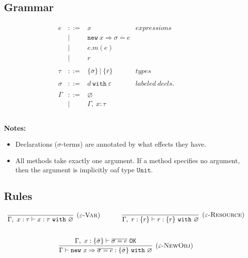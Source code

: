 \documentclass{llncs}
\newcommand{\keywadj}[1]{\mathtt{#1}}
\newcommand{\keyw}[1]{\keywadj{#1}~}
\begin{document}
\subsection{Grammar}

\[
\begin{array}{lll}
\begin{array}{lllr}

	e & ::= & x & expressions \\
  		& | & \keywadj{new}~x \Rightarrow \overline{\sigma = e} \\
  		& | & e.m(e)\\
  		& | & r \\
		&&\\

	\tau & ::= & \{ \bar \sigma \} ~ | ~ \{ \bar r \} & types \\
		&&\\

	\sigma & ::= & d~\keyw{with}\varepsilon  & labeled~ decls.\\
		&&\\
		
	\Gamma & ::= & \varnothing \\
		& | & \Gamma,~x : \tau\\
		&&\\

\end{array}
& ~~~~~~
&
\end{array}
\]


\noindent \textbf{Notes:}

\begin{itemize}
	\item Declarations ($\sigma$-terms) are annotated by what effects they have.
	\item All methods take exactly one argument. If a method specifies no argument, then the argument is implicitly oaf type $\keywadj{Unit}$.
\end{itemize}

\subsection{Rules}

\fbox{$\Gamma \vdash e : \tau~\keyw{with} \varnothing$}

\[
\begin{array}{c}
\infer[\textsc{($\varepsilon$-Var)}]
  {\Gamma,~x:\tau \vdash x:\tau~ \keyw{with} \varnothing}
  {} 
~~~~~~~~~~
\infer[\textsc{($\varepsilon$-Resource)}]
  {\Gamma,~r :\{r\} \vdash r:\{ r \} ~ \keyw{with} \varnothing}
  {} \\[5ex]

\infer[\textsc{($\varepsilon$-NewObj)}]
	{\Gamma \vdash \keywadj{new}~x \Rightarrow \overline{\sigma = e} : \{ \bar \sigma \}~\keyw{with} \varnothing}
	{\Gamma,~x : \{ \bar \sigma \} \vdash \overline{\sigma = e}~\keywadj{OK}} \\[5ex]
\end{array}
\]
\end{document}
